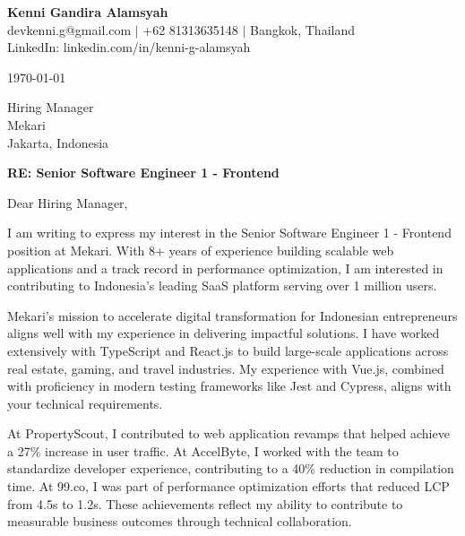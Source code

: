 \documentclass[11pt]{article}
\begin{document}
\begin{flushleft}
\textbf{\Large Kenni Gandira Alamsyah} \\[0.3em]
devkenni.g@gmail.com $|$ +62 81313635148 $|$ Bangkok, Thailand \\
LinkedIn: linkedin.com/in/kenni-g-alamsyah
\end{flushleft}

\vspace{1.5em}

\begin{flushleft}
\today
\end{flushleft}

\vspace{1em}

\begin{flushleft}
Hiring Manager \\
Mekari \\
Jakarta, Indonesia
\end{flushleft}

\vspace{1em}

\textbf{RE: Senior Software Engineer 1 - Frontend}

\vspace{1em}

Dear Hiring Manager,

I am writing to express my interest in the Senior Software Engineer 1 - Frontend position at Mekari. With 8+ years of experience building scalable web applications and a track record in performance optimization, I am interested in contributing to Indonesia's leading SaaS platform serving over 1 million users.

Mekari's mission to accelerate digital transformation for Indonesian entrepreneurs aligns well with my experience in delivering impactful solutions. I have worked extensively with TypeScript and React.js to build large-scale applications across real estate, gaming, and travel industries. My experience with Vue.js, combined with proficiency in modern testing frameworks like Jest and Cypress, aligns with your technical requirements.

At PropertyScout, I contributed to web application revamps that helped achieve a 27\% increase in user traffic. At AccelByte, I worked with the team to standardize developer experience, contributing to a 40\% reduction in compilation time. At 99.co, I was part of performance optimization efforts that reduced LCP from 4.5s to 1.2s. These achievements reflect my ability to contribute to measurable business outcomes through technical collaboration.
\end{document}
